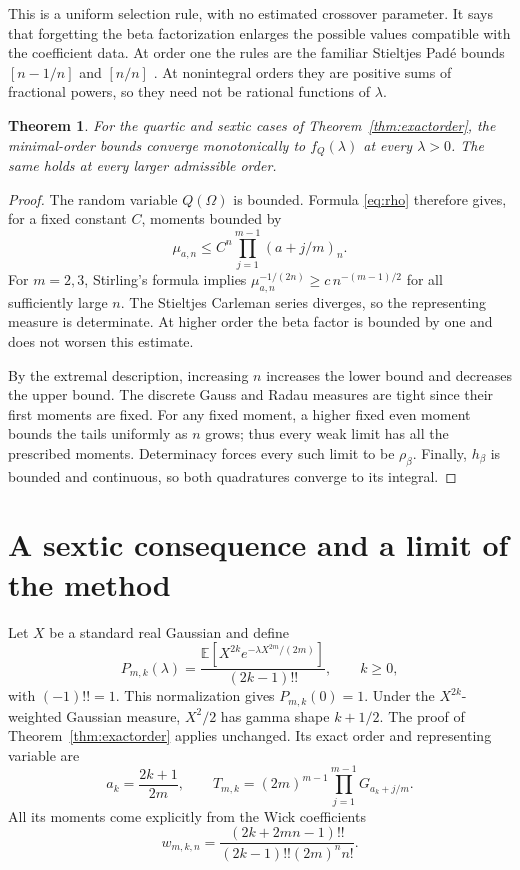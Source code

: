 \documentclass[11pt]{article}
\newtheorem{theorem}{Theorem}[section]
\theoremstyle{definition}
\newcommand{\E}{\mathbb E}
\numberwithin{equation}{section}
\begin{document}
This is a uniform selection rule, with no estimated crossover parameter.
It says that forgetting the beta factorization enlarges the possible
values compatible with the coefficient data. At order one the rules
are the familiar Stieltjes Pad\'e bounds $[n-1/n]$ and $[n/n]$
\cite{Allen}. At nonintegral orders they are
positive sums of fractional powers, so they need not be rational
functions of $\lambda$.

\begin{theorem}\label{thm:convergence}
For the quartic and sextic cases of Theorem~\ref{thm:exactorder}, the
minimal-order bounds converge monotonically to $f_Q(\lambda)$ at every
$\lambda>0$. The same holds at every larger admissible order.
\end{theorem}
\begin{proof}
The random variable $Q(\Omega)$ is bounded. Formula \eqref{eq:rho}
therefore gives, for a fixed constant $C$, moments bounded by
\[
 \mu_{a,n}\le C^n\prod_{j=1}^{m-1}(a+j/m)_n.
\]
For $m=2,3$, Stirling's formula implies
$\mu_{a,n}^{-1/(2n)}\ge c\,n^{-(m-1)/2}$ for all sufficiently large
$n$. The Stieltjes Carleman series diverges, so the representing measure
is determinate. At higher order the beta factor is bounded by one and
does not worsen this estimate.

By the extremal description, increasing $n$ increases the lower bound
and decreases the upper bound. The discrete Gauss and Radau measures
are tight since their first moments are fixed. For any fixed moment,
a higher fixed even moment bounds the tails uniformly as $n$ grows;
thus every weak limit has all the prescribed moments. Determinacy
forces every such limit to be $\rho_\beta$. Finally, $h_\beta$ is bounded
and continuous, so both quadratures converge to its integral.
\end{proof}

\section{A sextic consequence and a limit of the method}\label{sec:sextic}
Let $X$ be a standard real Gaussian and define
\[
 P_{m,k}(\lambda)=\frac{\E[X^{2k}e^{-\lambda X^{2m}/(2m)}]}
 {(2k-1)!!},\qquad k\ge0,
\]
with $(-1)!!=1$. This normalization gives $P_{m,k}(0)=1$.
Under the $X^{2k}$-weighted Gaussian measure, $X^2/2$ has gamma
shape $k+1/2$. The proof of Theorem~\ref{thm:exactorder} applies
unchanged. Its exact order and representing variable are
\begin{equation}\label{eq:scalarhigher}
 a_k=\frac{2k+1}{2m},\qquad
 T_{m,k}=(2m)^{m-1}\prod_{j=1}^{m-1}G_{a_k+j/m}.
\end{equation}
All its moments come explicitly from the Wick coefficients
\begin{equation}\label{eq:scalarhigherwick}
 w_{m,k,n}=\frac{(2k+2mn-1)!!}
 {(2k-1)!!(2m)^n n!}.
\end{equation}
\end{document}
